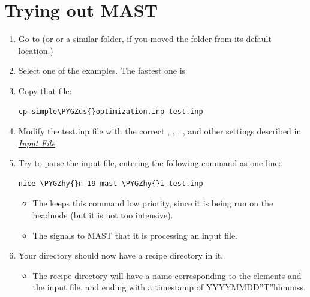 \documentclass[letterpaper,10pt,english]{sphinxmanual}
\def\PYGZus{\char`\_}
\def\PYGZhy{\char`\-}
\begin{document}
\chapter{Trying out MAST}
\label{17_0_testmast:trying-out-mast}\label{17_0_testmast::doc}\begin{enumerate}
\item {} 
Go to  (or  or a similar folder, if you moved the  folder from its default location.)

\item {} 
Select one of the examples. The fastest one is 

\item {} 
Copy that file:

\begin{Verbatim}[commandchars=\\\{\}]
cp simple\PYGZus{}optimization.inp test.inp
\end{Verbatim}

\item {} 
Modify the test.inp file with the correct , , , , and other settings described in {\hyperref[3_0_inputfile::doc]{\emph{Input File}}}

\item {} 
Try to parse the input file, entering the following command as one line:

\begin{Verbatim}[commandchars=\\\{\}]
nice \PYGZhy{}n 19 mast \PYGZhy{}i test.inp
\end{Verbatim}
\begin{itemize}
\item {} 
The  keeps this command low priority, since it is being run on the headnode (but it is not too intensive).

\item {} 
The  signals to MAST that it is processing an input file.

\end{itemize}

\item {} 
Your  directory should now have a recipe directory in it.
\begin{itemize}
\item {} 
The recipe directory will have a name corresponding to the elements and the input file, and ending with a timestamp of YYYYMMDD''T''hhmmss.


\end{itemize}
\end{enumerate}
\end{document}

